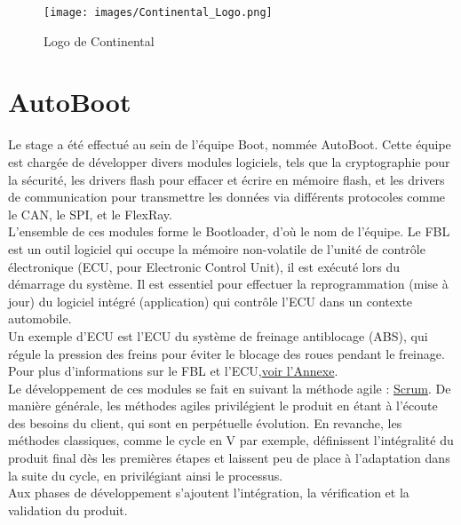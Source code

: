 \documentclass[a4paper, 12pt]{report}
\begin{document}
\begin{figure}[H]
    \centering
    \texttt{[image: images/Continental\_Logo.png]}
    \caption{Logo de Continental}
    \label{fig:CONLogo}
\end{figure}

\section{AutoBoot}\label{sec:autoBoot}
Le stage a été effectué au sein de l’équipe Boot, nommée AutoBoot. Cette équipe est chargée de développer divers modules logiciels, tels que la cryptographie pour la sécurité, les drivers flash pour effacer et écrire en mémoire flash, et les drivers de communication pour transmettre les données via différents protocoles comme le \ac{CAN}, le \ac{SPI}, et le FlexRay.\\

L’ensemble de ces modules forme le Bootloader, d’où le nom de l’équipe. Le \ac{FBL} est un outil logiciel qui occupe la mémoire non-volatile de l’unité de contrôle électronique (\acs{ECU}, pour Electronic Control Unit), il est exécuté lors du démarrage du système. Il est essentiel pour effectuer la reprogrammation (mise à jour) du logiciel intégré (application) qui contrôle l’\ac{ECU} dans un contexte automobile.\\

Un exemple d’\ac{ECU} est l’\ac{ECU} du système de freinage antiblocage (\acs{ABS}), qui régule la pression des freins pour éviter le blocage des roues pendant le freinage.\\

Pour plus d’informations sur le \ac{FBL} et l’\ac{ECU},\hyperref[subsec:bootloader]{voir l’Annexe}.\\

Le développement de ces modules se fait en suivant la méthode agile : \hyperref[subsec:scrum]{Scrum}. De manière générale, les méthodes agiles privilégient le produit en étant à l’écoute des besoins du client, qui sont en perpétuelle évolution. En revanche, les méthodes classiques, comme le cycle en V par exemple, définissent l’intégralité du produit final dès les premières étapes et laissent peu de place à l’adaptation dans la suite du cycle, en privilégiant ainsi le processus.\\

Aux phases de développement s'ajoutent l'intégration, la vérification et la validation du produit.
\end{document}
